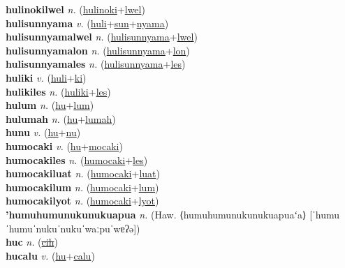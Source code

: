 \textbf{hulinokilwel} \textit{n.} (\hyperref[hulinoki]{hulinoki}+\hyperref[lwel]{lwel})
 \label{hulinokilwel} \\
\textbf{hulisunnyama} \textit{v.} (\hyperref[huli]{huli}+\hyperref[sun]{sun}+\hyperref[nyama]{nyama})
 \label{hulisunnyama} \\
\textbf{hulisunnyamalwel} \textit{n.} (\hyperref[hulisunnyama]{hulisunnyama}+\hyperref[lwel]{lwel})
 \label{hulisunnyamalwel} \\
\textbf{hulisunnyamalon} \textit{n.} (\hyperref[hulisunnyama]{hulisunnyama}+\hyperref[lon]{lon})
 \label{hulisunnyamalon} \\
\textbf{hulisunnyamales} \textit{n.} (\hyperref[hulisunnyama]{hulisunnyama}+\hyperref[les]{les})
 \label{hulisunnyamales} \\
\textbf{huliki} \textit{v.} (\hyperref[huli]{huli}+\hyperref[ki]{ki})
 \label{huliki} \\
\textbf{hulikiles} \textit{n.} (\hyperref[huliki]{huliki}+\hyperref[les]{les})
 \label{hulikiles} \\
\textbf{hulum} \textit{n.} (\hyperref[hu]{hu}+\hyperref[lum]{lum})
 \label{hulum} \\
\textbf{hulumah} \textit{n.} (\hyperref[hu]{hu}+\hyperref[lumah]{lumah})
 \label{hulumah} \\
\textbf{hunu} \textit{v.} (\hyperref[hu]{hu}+\hyperref[nu]{nu})
 \label{hunu} \\
\textbf{humocaki} \textit{v.} (\hyperref[hu]{hu}+\hyperref[mocaki]{mocaki})
 \label{humocaki} \\
\textbf{humocakiles} \textit{n.} (\hyperref[humocaki]{humocaki}+\hyperref[les]{les})
 \label{humocakiles} \\
\textbf{humocakiluat} \textit{n.} (\hyperref[humocaki]{humocaki}+\hyperref[luat]{luat})
 \label{humocakiluat} \\
\textbf{humocakilum} \textit{n.} (\hyperref[humocaki]{humocaki}+\hyperref[lum]{lum})
 \label{humocakilum} \\
\textbf{humocakilyot} \textit{n.} (\hyperref[humocaki]{humocaki}+\hyperref[lyot]{lyot})
 \label{humocakilyot} \\
\textbf{'humuhumunukunukuapua} \textit{n.} (Haw. ⟨humuhumunukunukuapuaʻa⟩ [ˈhumuˈhumuˈnukuˈnukuˈwaːpuˈwɐʔə])
 \label{'humuhumunukunukuapua} \\
\textbf{huc} \textit{n.} (\hyperref[cih]{\sout{cih}})
 \label{huc} \\
\textbf{hucalu} \textit{v.} (\hyperref[hu]{hu}+\hyperref[calu]{calu})
 \label{hucalu} \\
